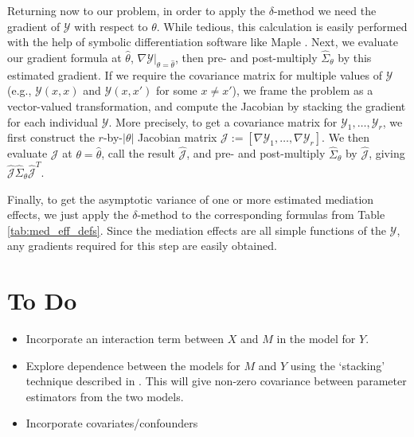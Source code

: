 \documentclass{report}
\newcommand{\sY}{\mathcal{Y}}
\begin{document}
Returning now to our problem, in order to apply the $\delta$-method we need the gradient of $\sY$ with respect to $\theta$. While tedious, this calculation is easily performed with the help of symbolic differentiation software like Maple \citep{Map20}. Next, we evaluate our gradient formula at $\hat{\theta}$, $\left. \nabla \sY \right|_{\theta = \hat{\theta}}$, then pre- and post-multiply $\hat{\Sigma}_\theta$ by this estimated gradient. If we require the covariance matrix for multiple values of $\sY$ (e.g., $\sY(x,x)$ and $\sY(x,x')$ for some $x \neq x'$), we frame the problem as a vector-valued transformation, and compute the Jacobian by stacking the gradient for each individual $\sY$. More precisely, to get a covariance matrix for $\sY_1, \ldots, \sY_r$, we first construct the $r$-by-$|\theta|$ Jacobian matrix $\mathcal{J} := [\nabla \sY_1, \ldots, \nabla \sY_r]$. We then evaluate $\mathcal{J}$ at $\theta = \hat{\theta}$, call the result $\hat{\mathcal{J}}$, and pre- and post-multiply $\hat{\Sigma}_\theta$ by $\hat{\mathcal{J}}$, giving $\hat{\mathcal{J}} \hat{\Sigma}_\theta \hat{\mathcal{J}}^T$.

Finally, to get the asymptotic variance of one or more estimated mediation effects, we just apply the $\delta$-method to the corresponding formulas from Table \ref{tab:med_eff_defs}. Since the mediation effects are all simple functions of the $\sY$, any gradients required for this step are easily obtained.


\section{To Do}
\begin{itemize}
    \item Incorporate an interaction term between $X$ and $M$ in the model for $Y$.
    \item Explore dependence between the models for $M$ and $Y$ using the `stacking' technique described in \citet{Bau06}. This will give non-zero covariance between parameter estimators from the two models.
    \item Incorporate covariates/confounders
\end{itemize}


% 

\end{document}
